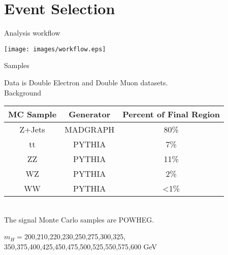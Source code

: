 \section{Event Selection}


\begin{frame}{Analysis workflow}
  \begin{center}
  \texttt{[image: images/workflow.eps]}
  \end{center}
\end{frame}


\begin{frame}{Samples}

\begin{center}

Data is Double Electron and Double Muon datasets.\\
\vspace{2em}
Background\\
\begin{tabular}{|c|c|c|}\hline
  MC Sample & Generator & Percent of Final Region \\ \hline \hline
  Z+Jets  & MADGRAPH & 80\% \\ \hline 
    tt      & PYTHIA & 7\%  \\ \hline
    ZZ      & PYTHIA & 11\% \\ \hline
    WZ      & PYTHIA & 2\%  \\ \hline
    WW      & PYTHIA & <1\% \\ \hline
\end{tabular}
\\
\vspace{2em}
The signal Monte Carlo samples are POWHEG.

$m_{H} = $200,210,220,230,250,275,300,325,\\
350,375,400,425,450,475,500,525,550,575,600 GeV

\end{center}

\end{frame}



